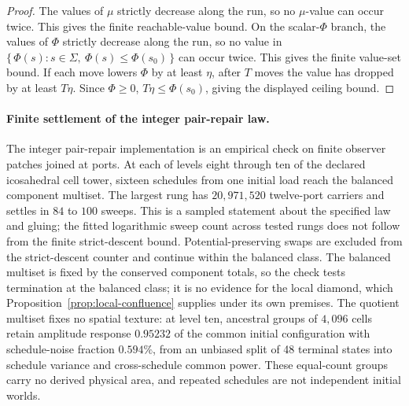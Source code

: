 \documentclass[11pt]{article}
\theoremstyle{remark}
\theoremstyle{plain}
\begin{document}
\begin{proof}
The values of \(\mu\) strictly decrease along the run, so no \(\mu\)-value can occur twice. This
gives the finite reachable-value bound. On the scalar-\(\Phi\) branch, the values of \(\Phi\)
strictly decrease along the run, so no value in
\(\{\,\Phi(s):s\in\Sigma,\ \Phi(s)\le \Phi(s_0)\,\}\) can occur twice. This gives the finite
value-set bound. If each move lowers \(\Phi\) by at least \(\eta\), after \(T\) moves the value has
dropped by at least \(T\eta\). Since \(\Phi\ge0\), \(T\eta\le\Phi(s_0)\), giving the displayed
ceiling bound.
\end{proof}

\paragraph{Finite settlement of the integer pair-repair law.}
The integer pair-repair implementation is an empirical check on finite
observer patches joined at ports. At each of levels eight through ten of
the declared icosahedral cell tower, sixteen schedules from one initial
load reach the balanced component multiset. The largest rung has
$20{,}971{,}520$ twelve-port carriers and settles in $84$ to $100$ sweeps.
This is a sampled statement about the specified law and gluing; the fitted
logarithmic sweep count across tested rungs does not follow from the
finite strict-descent bound. Potential-preserving swaps are excluded from the
strict-descent counter and continue within the balanced class. The
balanced multiset is fixed by the conserved component totals, so the check
tests termination at the balanced class; it is no evidence for the local
diamond, which Proposition~\ref{prop:local-confluence} supplies under its
own premises. The quotient multiset fixes no spatial texture: at level ten,
ancestral groups of $4{,}096$ cells retain amplitude response $0.95232$ of
the common initial configuration with schedule-noise fraction $0.594\%$,
from an unbiased split of 48 terminal states into schedule variance and
cross-schedule common power. These equal-count groups carry no derived
physical area, and repeated schedules are not independent initial worlds.
\end{document}
